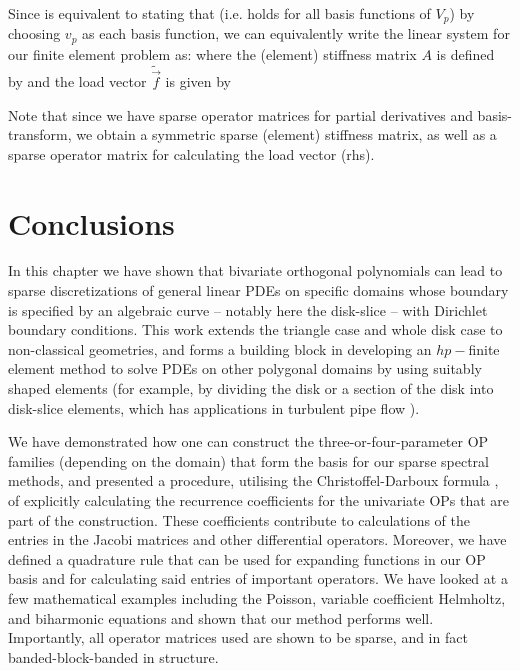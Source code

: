Since  is equivalent to stating that
(i.e. holds for all basis functions of $V_p$) by choosing $v_p$ as each basis function, we can equivalently write the linear system for our finite element problem as:
where the (element) stiffness matrix $A$ is defined by 
and the load vector $\tilde{\vec{f}}$ is given by 

Note that since we have sparse operator matrices for partial derivatives and basis-transform, we obtain a symmetric sparse (element) stiffness matrix, as well as a sparse operator matrix for calculating the load vector (rhs).



\section{Conclusions}

In this chapter we have shown that bivariate orthogonal polynomials can lead to sparse discretizations of general linear PDEs on specific domains whose boundary is specified by an algebraic curve -- notably here the disk-slice -- with Dirichlet boundary conditions. This work extends the triangle case \cite{beuchler2006new, li2010optimal, olver2019triangle} and whole disk case \cite{boyd2011comparing, vasil2016tensor} to non-classical geometries, and forms a building block in developing an $hp-$finite element method to solve PDEs on other polygonal domains by using suitably shaped elements (for example, by dividing the disk or a section of the disk into disk-slice elements, which has applications in turbulent pipe flow \cite{eggels1994fully, kerswell2005recent, vasil2016tensor}).

We have demonstrated how one can construct the three-or-four-parameter OP families (depending on the domain) that form the basis for our sparse spectral methods, and presented a procedure, utilising the Christoffel-Darboux formula \cite[18.2.2]{DLMF}, of explicitly calculating the recurrence coefficients for the univariate OPs that are part of the construction. These coefficients contribute to calculations of the entries in the Jacobi matrices and other differential operators. Moreover, we have defined a quadrature rule that can be used for expanding functions in our OP basis and for calculating said entries of important operators. We have looked at a few mathematical examples including the Poisson, variable coefficient Helmholtz, and biharmonic equations and shown that our method performs well. Importantly, all operator matrices used are shown to be sparse, and in fact banded-block-banded in structure.

